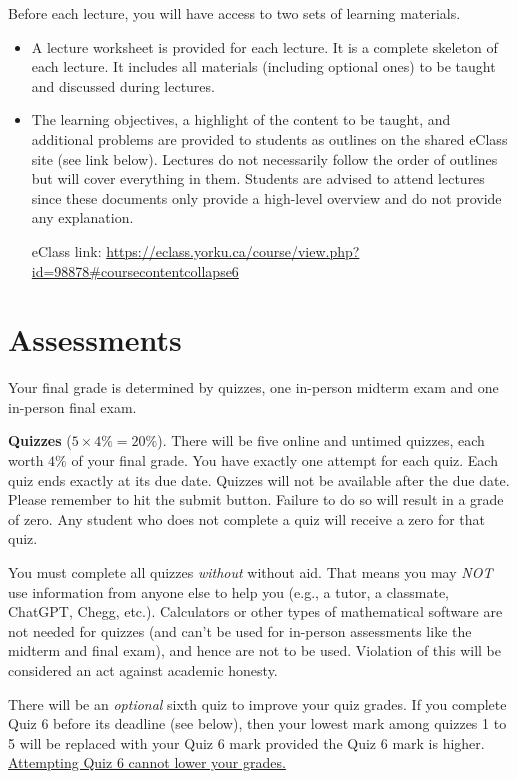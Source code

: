 \documentclass[./main.tex]{subfiles}
\begin{document}
Before each lecture, you will have access to two sets of learning materials.
\begin{itemize}
  \item A lecture worksheet is provided for each lecture. It is a complete skeleton of each lecture. It includes all materials (including optional ones) to be taught and discussed during lectures. 
  \item The learning objectives, a highlight of the content to be taught, and additional problems are provided to students as outlines on the shared eClass site (see link below). Lectures do not necessarily follow the order of outlines but will cover everything in them. Students are advised to attend lectures since these documents only provide a high-level overview and do not provide any explanation. 

    eClass link: \url{https://eclass.yorku.ca/course/view.php?id=98878#coursecontentcollapse6}
\end{itemize}


\section*{Assessments}

Your final grade is determined by quizzes, one in-person midterm exam and one in-person final exam. 

\textbf{Quizzes} (\(5 \times 4\% = 20\%\)). There will be five online and untimed quizzes, each worth \(4\%\) of your final grade. You have exactly one attempt for each quiz. Each quiz ends exactly at its due date. Quizzes will not be available after the due date. Please remember to hit the submit button. Failure to do so will result in a grade of zero. Any student who does not complete a quiz will receive a zero for that quiz. 

You must complete all quizzes \emph{without} without aid. That means you may \emph{NOT} use information from anyone else to help you (e.g., a tutor, a classmate, ChatGPT, Chegg, etc.). 
Calculators or other types of mathematical software are not needed for quizzes (and can't be used for in-person assessments like the midterm and final exam), and hence are not to be used. 
Violation of this will be considered an act against academic honesty. 

There will be an \textit{optional} sixth quiz to improve your quiz grades. If you complete Quiz 6 before its deadline (see below), then your lowest mark among quizzes 1 to 5 will be replaced with your Quiz 6 mark provided the Quiz 6 mark is higher. \underline{Attempting Quiz 6 cannot lower your grades.} 
\end{document}

